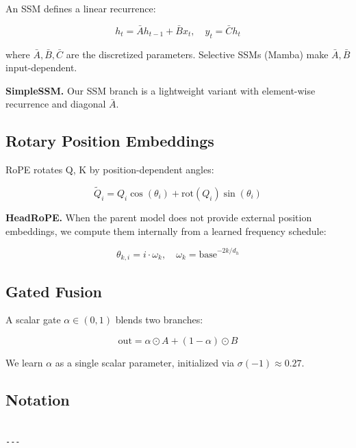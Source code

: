 An SSM defines a linear recurrence:

\[
h_t = \bar{A} h_{t-1} + \bar{B} x_t, \quad
y_t = \bar{C} h_t
\tag{3.5}
\]

where $\bar{A}, \bar{B}, \bar{C}$ are the discretized parameters. Selective 
SSMs (Mamba) make $\bar{A}, \bar{B}$ input-dependent.

\textbf{SimpleSSM.} Our SSM branch is a lightweight variant with element-wise 
recurrence and diagonal $\bar{A}$.

\subsection{Rotary Position Embeddings}

RoPE rotates Q, K by position-dependent angles:

\[
\tilde{Q}_i = Q_i \cos(\theta_i) + \text{rot}(Q_i) \sin(\theta_i)
\tag{3.6}
\]

\textbf{HeadRoPE.} When the parent model does not provide external position 
embeddings, we compute them internally from a learned frequency schedule:

\[
\theta_{k, i} = i \cdot \omega_k, \quad
\omega_k = \text{base}^{-2k / d_h}
\tag{3.7}
\]

\subsection{Gated Fusion}

A scalar gate $\alpha \in (0, 1)$ blends two branches:

\[
\text{out} = \alpha \odot A + (1 - \alpha) \odot B
\tag{3.8}
\]

We learn $\alpha$ as a single scalar parameter, initialized via 
$\sigma(-1) \approx 0.27$.

\subsection{Notation}

\begin{lstlisting}

---
\end{lstlisting}